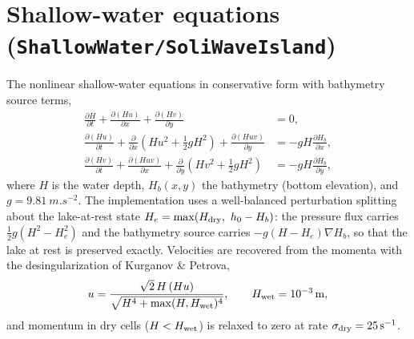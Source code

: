 \documentclass[11pt,a4paper]{article}
\begin{document}
\section{Shallow-water equations
(\texttt{ShallowWater/SoliWaveIsland})}
The nonlinear shallow-water equations in conservative form with
bathymetry source terms,
\begin{align}
  \frac{\partial H}{\partial t}
  + \frac{\partial (Hu)}{\partial x}
  + \frac{\partial (Hv)}{\partial y} &= 0, \\
  \frac{\partial (Hu)}{\partial t}
  + \frac{\partial}{\partial x}\!\left( Hu^2 + \tfrac{1}{2} g H^2 \right)
  + \frac{\partial (Huv)}{\partial y}
  &= -g H \frac{\partial H_b}{\partial x}, \\
  \frac{\partial (Hv)}{\partial t}
  + \frac{\partial (Huv)}{\partial x}
  + \frac{\partial}{\partial y}\!\left( Hv^2 + \tfrac{1}{2} g H^2 \right)
  &= -g H \frac{\partial H_b}{\partial y},
\end{align}
where $H$ is the water depth, $H_b(x,y)$ the bathymetry (bottom
elevation), and $g = \SI{9.81}{m.s^{-2}}$. The implementation uses a
well-balanced perturbation splitting about the lake-at-rest state
$H_e = \max(H_{\rm dry},\ h_0 - H_b)$: the pressure flux carries
$\tfrac{1}{2} g (H^2 - H_e^2)$ and the bathymetry source carries
$-g (H - H_e)\nabla H_b$, so that the lake at rest is preserved exactly.
Velocities are recovered from the momenta with the desingularization of
Kurganov \& Petrova,
\begin{equation}
  u = \frac{\sqrt{2}\, H\, (Hu)}{\sqrt{H^4 + \max(H, H_{\rm wet})^4}},
  \qquad H_{\rm wet} = 10^{-3}\,\si{m},
\end{equation}
and momentum in dry cells ($H < H_{\rm wet}$) is relaxed to zero at rate
$\sigma_{\rm dry} = \SI{25}{s^{-1}}$.
\end{document}
